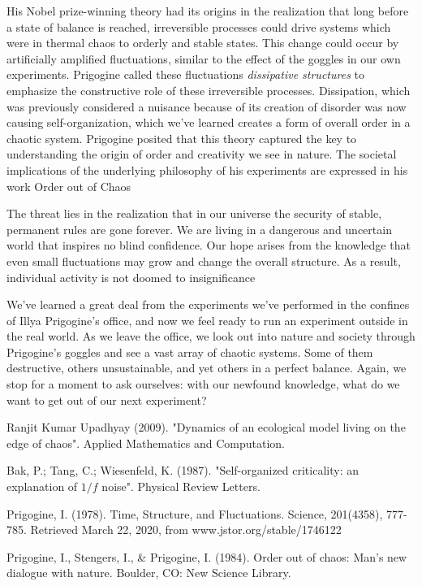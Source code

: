 \documentclass{article}
\begin{document}
His Nobel prize-winning theory had its origins in the realization that long before a state of balance is reached, irreversible processes could drive systems which were in thermal chaos to orderly and stable states\cite{ds}. This change could occur by artificially amplified fluctuations, similar to the effect of the goggles in our own experiments. Prigogine called these fluctuations \emph{dissipative structures} to emphasize the constructive role of these irreversible processes. Dissipation, which was previously considered a nuisance because of its creation of disorder was now causing self-organization, which we've learned creates a form of overall order in a chaotic system. Prigogine posited that this theory captured the key to understanding the origin of order and creativity we see in nature. The societal implications of the underlying philosophy of his experiments are expressed in his work Order out of Chaos\cite{oooc}
\begin{displayquote}
The threat lies in the realization that in our universe the security of stable, permanent rules are gone forever. We are living in a dangerous and uncertain world that inspires no blind confidence. Our hope arises from the knowledge that even small fluctuations may grow and change the overall structure. As a result, individual activity is not doomed to insignificance
\end{displayquote}

We've learned a great deal from the experiments we've performed in the confines of Illya Prigogine's office, and now we feel ready to run an experiment outside in the real world. As we leave the office, we look out into nature and society through Prigogine's goggles and see a vast array of chaotic systems. Some of them destructive, others unsustainable, and yet others in a perfect balance. Again, we stop for a moment to ask ourselves: with our newfound knowledge, what do we want to get out of our next experiment?





\begin{thebibliography}{9}

Ranjit Kumar Upadhyay (2009). "Dynamics of an ecological model living on the edge of chaos". Applied Mathematics and Computation.

Bak, P.; Tang, C.; Wiesenfeld, K. (1987). "Self-organized criticality: an explanation of $1/f$ noise". Physical Review Letters.

Prigogine, I. (1978). Time, Structure, and Fluctuations. Science, 201(4358), 777-785. Retrieved March 22, 2020, from www.jstor.org/stable/1746122

Prigogine, I., Stengers, I., & Prigogine, I. (1984). Order out of chaos: Man's new dialogue with nature. Boulder, CO: New Science Library.

\end{thebibliography}
\end{document}
